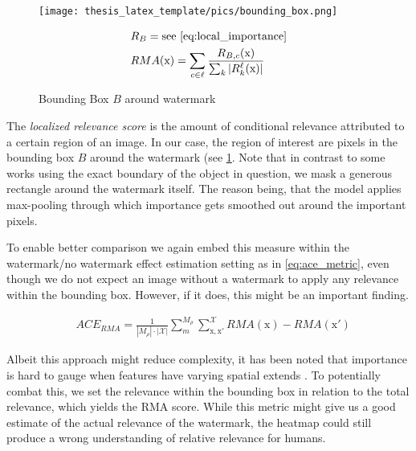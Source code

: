 \begin{figure}[t!]
\begin{minipage}[t]{0.45\textwidth}
    \vspace{-\topskip}
        \texttt{[image: thesis\_latex\_template/pics/bounding\_box.png]}
\end{minipage}
\begin{minipage}[t]{0.45\textwidth}
\begin{align}\displaystyle
& R_B = \mathrm{ see \ \cref{eq:local_importance}} \\
& RMA(\mathrm{x}) = \sum_{c \in \ell}  \frac{
R_{B,c}(\mathrm{x})}{\sum_k |R_k^{\ell}(\mathrm{x})|}
\end{align}
\end{minipage}
\caption{Bounding Box $B$ around watermark}
\label{fig:bounding_box}
\end{figure}

The \textit{localized relevance score} is the amount of conditional relevance attributed to a certain region of an image. In our case, the region of interest are pixels in the bounding box $B$ around the watermark (see \cref{fig:bounding_box}. Note that in contrast to some works using the exact boundary of the object in question, we mask a generous rectangle around the watermark itself. The reason being, that the model applies max-pooling through which importance gets smoothed out around the important pixels. 

To enable better comparison we again embed this measure within the watermark/no watermark effect estimation setting as in \cref{eq:ace_metric}, even though we do not expect an image without a watermark to apply any relevance within the bounding box. However, if it does, this might be an important finding.

\begin{align}\label{eq:ace_rma}
& ACE_{RMA} = \frac{1}{|M_\rho|\cdot |\mathcal{X}| }\sum_{m}^{M_{\rho}} \sum_{\mathrm{x,x'}}^{\mathcal{X}} RMA(\mathrm{x}) - RMA(\mathrm{x'})
\end{align}

Albeit this approach might reduce complexity, it has been noted that importance is hard to gauge when features have varying spatial extends \cite{Achtibat2022}. 
To potentially combat this, we set the relevance within the bounding box in relation to the total relevance, which yields the RMA score.
While this metric might give us a good estimate of the actual relevance of the watermark, the heatmap could still produce a wrong understanding of relative relevance for humans. \\

